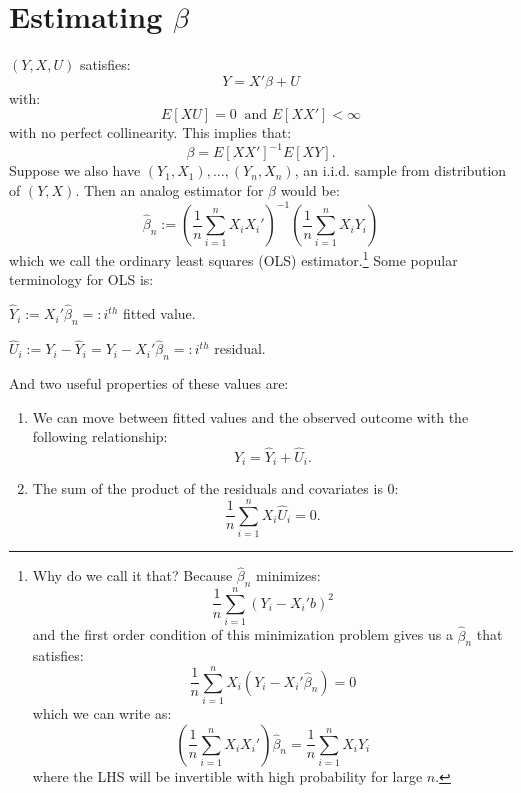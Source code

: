 \documentclass{tufte-book}
\theoremstyle{mytheoremstyle}
\theoremstyle{mylemstyle}
\theoremstyle{mydefstyle}
\begin{document}
\section{Estimating \(\beta\)}
 \((Y, X, U)\) satisfies:
	\[Y = X'\beta + U\]
with:
	\[E[XU] = 0\ \text{ and } E[XX'] < \infty\]
with no perfect collinearity. This implies that:
	\[\beta = E[XX']^{-1}E[XY] \text{.}\]
Suppose we also have \((Y_1, X_1), \dots, (Y_n, X_n)\), an i.i.d. sample from distribution of \((Y, X)\). Then an analog estimator for \(\beta\) would be:
	\[\hat{\beta}_n := \left(\frac{1}{n} \sum_{i = 1}^n X_iX_i'\right)^{-1}\left(\frac{1}{n}\sum_{i=1}^n X_iY_i\right)\]
which we call the ordinary least squares (OLS) estimator.\footnote{Why do we call it that? Because \(\hat{\beta}_n\) minimizes:
	\[\frac{1}{n} \sum_{i=1}^n (Y_i - X_i'b)^2\]
and the first order condition of this minimization problem gives us a \(\hat{\beta}_n\) that satisfies:
	\[\frac{1}{n} \sum_{i =1}^n X_i(Y_i - X_i'\hat{\beta}_n) = 0\]
which we can write as:
	\[\left(\frac{1}{n}\sum_{i=1}^n X_i X_i'\right) \hat{\beta}_n = \frac{1}{n}\sum_{i = 1}^n X_i Y_i\]
where the LHS will be invertible with high probability for large \(n\).} Some popular terminology for OLS is: \begin{description}
	\item \(\hat{Y}_i := X_i'\hat{\beta}_n =: i^{th}\) fitted value.
	\item \(\hat{U}_i := Y_i - \hat{Y}_i = Y_i - X_i'\hat{\beta}_n =: i^{th}\) residual.
\end{description} And two useful properties of these values are: \begin{enumerate}
	\item We can move between fitted values and the observed outcome with the following relationship:
		\[Y_i = \hat{Y}_i + \hat{U}_i \text{.}\] 
	\item The sum of the product of the residuals and covariates is 0:
		\[\frac{1}{n} \sum_{i=1}^n X_i\hat{U}_i = 0 \text{.}\]
\end{enumerate}
\end{document}
